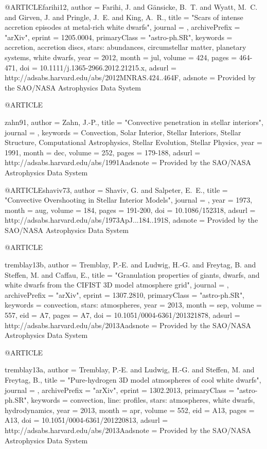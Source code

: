 \documentclass[a4paper,fleqn,usenatbib]{mnras}
\begin{document}
{{{{{{@ARTICLE{farihi12,
   author = {{Farihi}, J. and {G{\"a}nsicke}, B.~T. and {Wyatt}, M.~C. and 
	{Girven}, J. and {Pringle}, J.~E. and {King}, A.~R.},
    title = "{Scars of intense accretion episodes at metal-rich white dwarfs}",
  journal = {\mnras},
archivePrefix = "arXiv",
   eprint = {1205.0004},
 primaryClass = "astro-ph.SR",
 keywords = {accretion, accretion discs, stars: abundances, circumstellar matter, planetary systems, white dwarfs},
     year = 2012,
    month = jul,
   volume = 424,
    pages = {464-471},
      doi = {10.1111/j.1365-2966.2012.21215.x},
   adsurl = {http://adsabs.harvard.edu/abs/2012MNRAS.424..464F},
  adsnote = {Provided by the SAO/NASA Astrophysics Data System}
}

@ARTICLE{zahn91,
   author = {{Zahn}, J.-P.},
    title = "{Convective penetration in stellar interiors}",
  journal = {\aap},
 keywords = {Convection, Solar Interior, Stellar Interiors, Stellar Structure, Computational Astrophysics, Stellar Evolution, Stellar Physics},
     year = 1991,
    month = dec,
   volume = 252,
    pages = {179-188},
   adsurl = {http://adsabs.harvard.edu/abs/1991Aadsnote = {Provided by the SAO/NASA Astrophysics Data System}
}

@ARTICLE{shaviv73,
   author = {{Shaviv}, G. and {Salpeter}, E.~E.},
    title = "{Convective Overshooting in Stellar Interior Models}",
  journal = {\apj},
     year = 1973,
    month = aug,
   volume = 184,
    pages = {191-200},
      doi = {10.1086/152318},
   adsurl = {http://adsabs.harvard.edu/abs/1973ApJ...184..191S},
  adsnote = {Provided by the SAO/NASA Astrophysics Data System}
}

@ARTICLE{tremblay13b,
   author = {{Tremblay}, P.-E. and {Ludwig}, H.-G. and {Freytag}, B. and 
	{Steffen}, M. and {Caffau}, E.},
    title = "{Granulation properties of giants, dwarfs, and white dwarfs from the CIFIST 3D model atmosphere grid}",
  journal = {\aap},
archivePrefix = "arXiv",
   eprint = {1307.2810},
 primaryClass = "astro-ph.SR",
 keywords = {convection, stars: atmospheres},
     year = 2013,
    month = sep,
   volume = 557,
      eid = {A7},
    pages = {A7},
      doi = {10.1051/0004-6361/201321878},
   adsurl = {http://adsabs.harvard.edu/abs/2013Aadsnote = {Provided by the SAO/NASA Astrophysics Data System}
}

@ARTICLE{tremblay13a,
   author = {{Tremblay}, P.-E. and {Ludwig}, H.-G. and {Steffen}, M. and 
	{Freytag}, B.},
    title = "{Pure-hydrogen 3D model atmospheres of cool white dwarfs}",
  journal = {\aap},
archivePrefix = "arXiv",
   eprint = {1302.2013},
 primaryClass = "astro-ph.SR",
 keywords = {convection, line: profiles, stars: atmospheres, white dwarfs, hydrodynamics},
     year = 2013,
    month = apr,
   volume = 552,
      eid = {A13},
    pages = {A13},
      doi = {10.1051/0004-6361/201220813},
   adsurl = {http://adsabs.harvard.edu/abs/2013Aadsnote = {Provided by the SAO/NASA Astrophysics Data System}
}


}}}}}}}}}
\end{document}

